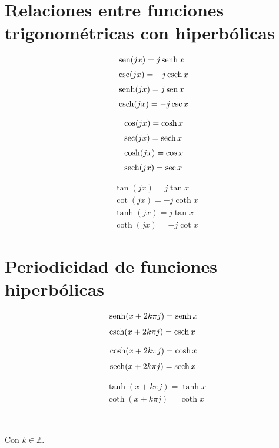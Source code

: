\section*{Relaciones entre funciones trigonométricas con hiperbólicas}

\begin{minipage}[t]{0.3\textwidth}
\begin{align*}
& \operatorname{sen} (jx) = j\operatorname{senh} x\\[3pt]
& \csc(jx) = -j\operatorname{csch} x\\[3pt]
& \operatorname{senh} (jx) = j\operatorname{sen} x\\[3pt]
& \operatorname{csch}(jx) = -j\csc x
\end{align*}
\end{minipage} 
\begin{minipage}[t]{0.3\textwidth}
\begin{align*}
& \cos (jx) = \cosh x\\[3pt]
& \sec(jx) = \operatorname{sech} x\\[3pt]
& \cosh (jx) = \cos x\\[3pt]
& \operatorname{sech}(jx) = \sec x
\end{align*}
\end{minipage}
\begin{minipage}[t]{0.3\textwidth}
\begin{align*}
& \tan (jx) = j\tan x\\[3pt]
& \cot(jx) = -j\coth x\\[3pt]
& \tanh (jx) = j\tan x\\[3pt]
& \coth(jx) = -j\cot x
\end{align*}
\end{minipage}


\section*{Periodicidad de funciones hiperbólicas}

\begin{minipage}[t]{0.3\textwidth}
\begin{align*}
& \operatorname{senh} (x+2k\pi j) = \operatorname{senh} x\\[4pt]
& \operatorname{csch} (x+2k\pi j) = \operatorname{csch} x
\end{align*}
\end{minipage} 
\begin{minipage}[t]{0.3\textwidth}
\begin{align*}
& \cosh (x+2k\pi j) = \cosh x\\[4pt]
& \operatorname{sech} (x+2k\pi j) = \operatorname{sech} x
\end{align*}
\end{minipage}
\begin{minipage}[t]{0.3\textwidth}
\begin{align*}
& \tanh (x+k\pi j) = \tanh x\\[4pt]
& \coth (x+k\pi j) = \coth x
\end{align*}
\end{minipage}\\
\begin{center}
Con $k \in \mathbb{Z}$.
\end{center}

